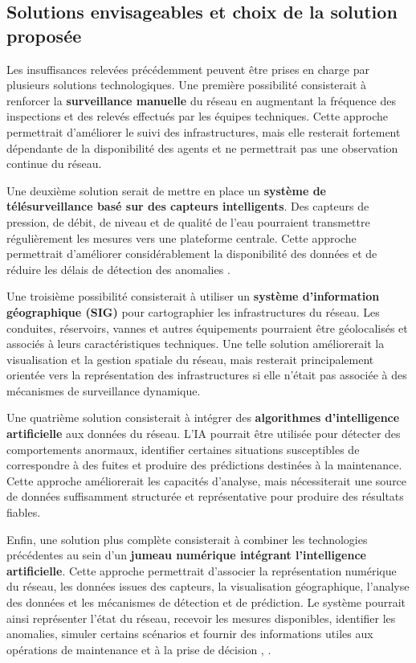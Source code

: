 \subsection{Solutions envisageables et choix de la solution proposée}
\label{solutions-envisageables-et-choix}

Les insuffisances relevées précédemment peuvent être prises en charge
par plusieurs solutions technologiques. Une première possibilité
consisterait à renforcer la \textbf{surveillance manuelle} du réseau en
augmentant la fréquence des inspections et des relevés effectués par
les équipes techniques. Cette approche permettrait d'améliorer le suivi
des infrastructures, mais elle resterait fortement dépendante de la
disponibilité des agents et ne permettrait pas une observation continue
du réseau.

Une deuxième solution serait de mettre en place un
\textbf{système de télésurveillance basé sur des capteurs intelligents}.
Des capteurs de pression, de débit, de niveau et de qualité de l'eau
pourraient transmettre régulièrement les mesures vers une plateforme
centrale. Cette approche permettrait d'améliorer considérablement la
disponibilité des données et de réduire les délais de détection des
anomalies \cite{ref20}.

Une troisième possibilité consisterait à utiliser un
\textbf{système d'information géographique (SIG)} pour cartographier les
infrastructures du réseau. Les conduites, réservoirs, vannes et autres
équipements pourraient être géolocalisés et associés à leurs
caractéristiques techniques. Une telle solution améliorerait la
visualisation et la gestion spatiale du réseau, mais resterait
principalement orientée vers la représentation des infrastructures si
elle n'était pas associée à des mécanismes de surveillance dynamique.

Une quatrième solution consisterait à intégrer des
\textbf{algorithmes d'intelligence artificielle} aux données du réseau.
L'IA pourrait être utilisée pour détecter des comportements anormaux,
identifier certaines situations susceptibles de correspondre à des
fuites et produire des prédictions destinées à la maintenance. Cette
approche améliorerait les capacités d'analyse, mais nécessiterait une
source de données suffisamment structurée et représentative pour
produire des résultats fiables.

Enfin, une solution plus complète consisterait à combiner les
technologies précédentes au sein d'un \textbf{jumeau numérique
	intégrant l'intelligence artificielle}. Cette approche permettrait
d'associer la représentation numérique du réseau, les données issues des
capteurs, la visualisation géographique, l'analyse des données et les
mécanismes de détection et de prédiction. Le système pourrait ainsi
représenter l'état du réseau, recevoir les mesures disponibles,
identifier les anomalies, simuler certains scénarios et fournir des
informations utiles aux opérations de maintenance et à la prise de
décision \cite{ref17}, \cite{ref114}.

